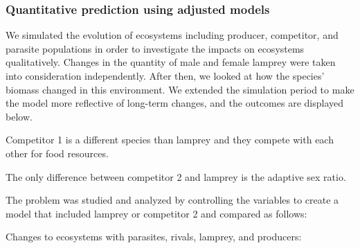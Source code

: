 \documentclass[12pt]{article}  %
\begin{document}
\subsubsection{Quantitative prediction using adjusted models}
We simulated the evolution of ecosystems including producer, competitor, and parasite populations in order to investigate the impacts on ecosystems qualitatively. Changes in the quantity of male and female lamprey were taken into consideration independently. After then, we looked at how the species' biomass changed in this environment. We extended the simulation period to make the model more reflective of long-term changes, and the outcomes are displayed below.
\par
Competitor 1 is a different species than lamprey and they compete with each other for food resources.\par
The only difference between competitor 2 and lamprey is the adaptive sex ratio.\par
The problem was studied and analyzed by controlling the variables to create a model that included lamprey or competitor 2 and compared as follows:
\par
 Changes to ecosystems with parasites, rivals, lamprey, and producers:\par
\end{document}
